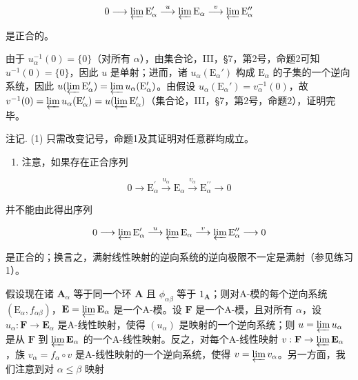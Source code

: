 \[
0 \longrightarrow \varprojlim \mathrm{E} _ {\alpha} ^ {\prime} \stackrel {u} {\longrightarrow} \varprojlim \mathrm{E} _ {\alpha} \stackrel {v} {\longrightarrow} \varprojlim \mathrm{E} _ {\alpha} ^ {\prime \prime}
\]

是正合的。

由于 \(u_{\alpha}^{-1}(0) = \{0\}\)（对所有 \(\alpha\)），由集合论，III，§7，第2号，命题2可知 \(u^{-1}(0) = \{0\}\)，因此 \(u\) 是单射；进而，诸 \(u_{\alpha}(\mathrm{E}_{\alpha}')\) 构成 \(\mathrm{E}_{\alpha}\) 的子集的一个逆向系统，因此 \(u(\varprojlim \mathrm{E}_{\alpha}') = \varprojlim u_{\alpha}(\mathrm{E}_{\alpha}')\)。由假设 \(u_{\alpha}(\mathrm{E}_{\alpha}') = v_{\alpha}^{-1}(0)\)，故 \(v^{-1}(0) = \varprojlim u_{\alpha}(\mathrm{E}_{\alpha}') = u(\varprojlim \mathrm{E}_{\alpha}')\)（集合论，III，§7，第2号，命题2），证明完毕。

注记. (1) 只需改变记号，命题1及其证明对任意群均成立。

\begin{enumerate}
\def\labelenumi{(\arabic{enumi})}
\setcounter{enumi}{1}
\tightlist
\item
  注意，如果存在正合序列
\end{enumerate}

\[
0 \longrightarrow \mathrm{E} _ {\alpha} ^ {\prime} \stackrel {u _ {\alpha}} {\longrightarrow} \mathrm{E} _ {\alpha} \stackrel {v _ {\alpha}} {\longrightarrow} \mathrm{E} _ {\alpha} ^ {\prime \prime} \longrightarrow 0
\]

并不能由此得出序列

\[
0 \longrightarrow \varprojlim \mathrm{E} _ {\alpha} ^ {\prime} \stackrel {u} {\longrightarrow} \varprojlim \mathrm{E} _ {\alpha} \stackrel {v} {\longrightarrow} \varprojlim \mathrm{E} _ {\alpha} ^ {\prime \prime} \longrightarrow 0
\]

是正合的；换言之，满射线性映射的逆向系统的逆向极限不一定是满射（参见练习1）。

假设现在诸 \(\mathbf{A}_{\alpha}\) 等于同一个环 \(\mathbf{A}\) 且 \(\phi_{\alpha \beta}\) 等于 \(1_{\mathbf{A}}\)；则对A-模的每个逆向系统 \((\mathrm{E}_{\alpha}, f_{\alpha \beta})\)，\(\mathbf{E} = \varprojlim \mathbf{E}_{\alpha}\) 是一个A-模。设 \(\mathbf{F}\) 是一个A-模，且对所有 \(\alpha\)，设 \(u_{\alpha}: \mathbf{F} \to \mathbf{E}_{\alpha}\) 是A-线性映射，使得 \((u_{\alpha})\) 是映射的一个逆向系统；则 \(u = \varprojlim u_{\alpha}\) 是从 \(\mathbf{F}\) 到 \(\varprojlim \mathbf{E}_{\alpha}\) 的一个A-线性映射。反之，对每个A-线性映射 \(v: \mathbf{F} \to \varprojlim \mathbf{E}_{\alpha}\)，族 \(v_{\alpha} = f_{\alpha} \circ v\) 是A-线性映射的一个逆向系统，使得 \(v = \varprojlim v_{\alpha}\)。另一方面，我们注意到对 \(\alpha \leqslant \beta\) 映射

